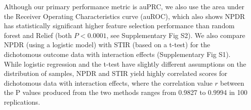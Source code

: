 \documentclass[10pt]{article}
\begin{document}

Although our primary performance metric is auPRC, we also use the area under the Receiver Operating Characteristics curve (auROC), which also shows NPDR has statistically significant higher feature selection performance than random forest and Relief (both $P < 0.0001$, see Supplementary Fig S2). We also compare NPDR (using a logistic model) with STIR (based on a t-test) for the dichotomous outcome data with interaction effects (Supplementary Fig S1).
While logistic regression and the t-test have slightly different assumptions on the distribution of samples, NPDR and STIR yield highly correlated scores for dichotomous data with interaction effects, where the correlation value $r$ between the P values produced from the two methods ranges from 0.9827 to 0.9994 in 100 replications. 
\end{document}
